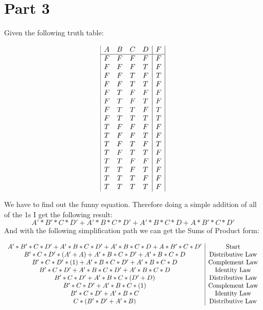 \section{Part 3}
Given the following truth table:
\begin{figure}[!htbp]
    \centering
    \begin{displaymath}
    \begin{array}{|c c c c|c|}
      A & B & C & D & F \\
    \hline
      F & F & F & F & F \\
      F & F & F & T & F \\
      F & F & T & F & T \\
      F & F & T & T & F \\
      F & T & F & F & F \\
      F & T & F & T & F \\
      F & T & T & F & T \\
      F & T & T & T & T \\
      T & F & F & F & F \\
      T & F & F & T & F \\
      T & F & T & F & T \\
      T & F & T & T & F \\
      T & T & F & F & F \\
      T & T & F & T & F \\
      T & T & T & F & F \\
      T & T & T & T & F \\
    \end{array}
    \end{displaymath}
\end{figure}
We have to find out the funny equation. Therefore doing a simple addition of all of the 1s I get the following result:
$$ A'*B'*C*D' + A'*B*C*D' + A'*B*C*D + A*B'*C*D' $$
And with the following simplification path we can get the Sums of Product form:
\begin{centering}
  \begin{displaymath}
  \begin{array}{c | c}
    A'*B'*C*D' + A'*B*C*D' + A'*B*C*D + A*B'*C*D' & $Start$ \\
    B'*C*D'*(A' + A) + A'*B*C*D' + A'*B*C*D & $Distributive Law$ \\
    B'*C*D'*(1) + A'*B*C*D' + A'*B*C*D & $Complement Law$ \\
    B'*C*D' + A'*B*C*D' + A'*B*C*D & $Identity Law$ \\
    B'*C*D' + A'*B*C*(D' + D) & $Distributive Law$ \\
    B'*C*D' + A'*B*C*(1) & $Complement Law$ \\
    B'*C*D' + A'*B*C & $Identity Law$ \\
    C*(B'*D' + A'*B) & $Distributive Law$ \\
  \end{array}
  \end{displaymath}
\end{centering}
